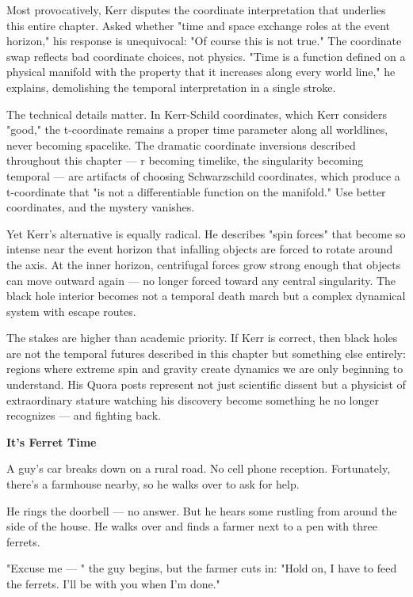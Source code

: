 \begin{commentary}
Most provocatively, Kerr disputes the coordinate interpretation that underlies this entire chapter. Asked whether "time and space exchange roles at the event horizon," his response is unequivocal: "Of course this is not true." The coordinate swap reflects bad coordinate choices, not physics. "Time is a function defined on a physical manifold with the property that it increases along every world line," he explains, demolishing the temporal interpretation in a single stroke.

The technical details matter. In Kerr-Schild coordinates, which Kerr considers "good," the t-coordinate remains a proper time parameter along all worldlines, never becoming spacelike. The dramatic coordinate inversions described throughout this chapter — r becoming timelike, the singularity becoming temporal — are artifacts of choosing Schwarzschild coordinates, which produce a t-coordinate that "is not a differentiable function on the manifold." Use better coordinates, and the mystery vanishes.

Yet Kerr's alternative is equally radical. He describes "spin forces" that become so intense near the event horizon that infalling objects are forced to rotate around the axis. At the inner horizon, centrifugal forces grow strong enough that objects can move outward again — no longer forced toward any central singularity. The black hole interior becomes not a temporal death march but a complex dynamical system with escape routes.

The stakes are higher than academic priority. If Kerr is correct, then black holes are not the temporal futures described in this chapter but something else entirely: regions where extreme spin and gravity create dynamics we are only beginning to understand. His Quora posts represent not just scientific dissent but a physicist of extraordinary stature watching his discovery become something he no longer recognizes — and fighting back.
\end{commentary}

\medskip

\noindent\textbf{It's Ferret Time}

A guy's car breaks down on a rural road. No cell phone reception. Fortunately, there's a farmhouse nearby, so he walks over to ask for help.

He rings the doorbell — no answer. But he hears some rustling from around the side of the house. He walks over and finds a farmer next to a pen with three ferrets.

"Excuse me — " the guy begins, but the farmer cuts in: "Hold on, I have to feed the ferrets. I'll be with you when I'm done."

